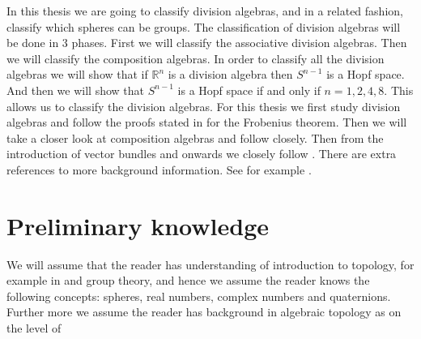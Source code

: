 \documentclass[../Thesis.tex]{subfile}
\begin{document}
In this thesis we are going to classify division algebras, and in a related fashion, classify which spheres can be groups. The classification of division algebras will be done in 3 phases. First we will classify the associative division algebras. Then we will classify the composition algebras. In order to classify all the division algebras we will show that if $\mathbb{R}^n$ is a division algebra then $S^{n-1}$ is a Hopf space. And then we will show that $S^{n-1}$ is a Hopf space if and only if $n = 1,2,4,8$. This allows us to classify the division algebras. For this thesis we first study division algebras and follow the proofs stated in \cite{Frob} for the Frobenius theorem. Then we will take a closer look at composition algebras and follow \cite{Hurwitz} closely. Then from the introduction of vector bundles and onwards we closely follow \cite{VBKT}. There are extra references to more background information. See for example \cite{Adams}.
\section{Preliminary knowledge}
We will assume that the reader has understanding of introduction to topology, for example in \cite{topo} and group theory, and hence we assume the reader knows the following concepts: spheres, real numbers, complex numbers and quaternions. Further more we assume the reader has background in algebraic topology as on the level of \cite{AG}
\end{document}

